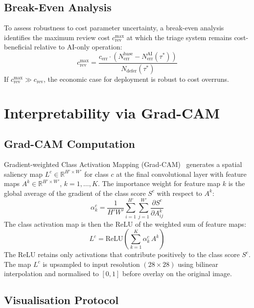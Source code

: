 \subsection{Break-Even Analysis}

To assess robustness to cost parameter uncertainty, a break-even analysis identifies the maximum review cost $c_{\text{rev}}^{\text{max}}$ at which the triage system remains cost-beneficial relative to AI-only operation:
\begin{equation}
    c_{\text{rev}}^{\text{max}} = \frac{c_{\text{err}} \cdot (N_{\text{err}}^{\text{base}} - N_{\text{err}}^{\text{AI}}(\tau^*))}{N_{\text{defer}}(\tau^*)}
\end{equation}
If $c_{\text{rev}}^{\text{max}} \gg c_{\text{rev}}$, the economic case for deployment is robust to cost overruns.

\section{Interpretability via Grad-CAM}

\subsection{Grad-CAM Computation}

Gradient-weighted Class Activation Mapping (Grad-CAM)~\cite{selvaraju2017grad} generates a spatial saliency map $L^c \in \mathbb{R}^{H' \times W'}$ for class $c$ at the final convolutional layer with feature maps $A^k \in \mathbb{R}^{H' \times W'}$, $k = 1, \ldots, K$. The importance weight for feature map $k$ is the global average of the gradient of the class score $S^c$ with respect to $A^k$:
\begin{equation}
    \alpha_k^c = \frac{1}{H' W'} \sum_{i=1}^{H'} \sum_{j=1}^{W'} \frac{\partial S^c}{\partial A_{ij}^k}
\end{equation}
The class activation map is then the ReLU of the weighted sum of feature maps:
\begin{equation}
    L^c = \text{ReLU}\!\left(\sum_{k=1}^{K} \alpha_k^c\, A^k\right)
\end{equation}
The ReLU retains only activations that contribute positively to the class score $S^c$. The map $L^c$ is upsampled to input resolution $(28 \times 28)$ using bilinear interpolation and normalised to $[0, 1]$ before overlay on the original image.

\subsection{Visualisation Protocol}

